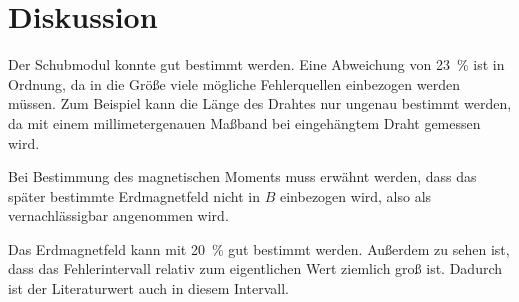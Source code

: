 \section{Diskussion}
\label{sec:Diskussion}

Der Schubmodul konnte gut bestimmt werden. Eine Abweichung von
\SI{23}{\percent} ist in Ordnung, da in die Größe viele mögliche
Fehlerquellen einbezogen werden müssen. Zum Beispiel kann die Länge des
Drahtes nur ungenau bestimmt werden, da mit einem millimetergenauen
Maßband bei eingehängtem Draht gemessen wird.

Bei Bestimmung des magnetischen Moments muss erwähnt werden, dass das
später bestimmte Erdmagnetfeld nicht in $B$ einbezogen wird, also
als vernachlässigbar angenommen wird.

Das Erdmagnetfeld kann mit \SI{20}{\percent} gut bestimmt werden.
Außerdem zu sehen ist, dass das Fehlerintervall relativ zum eigentlichen Wert
ziemlich groß ist. Dadurch ist der Literaturwert auch in diesem Intervall.
